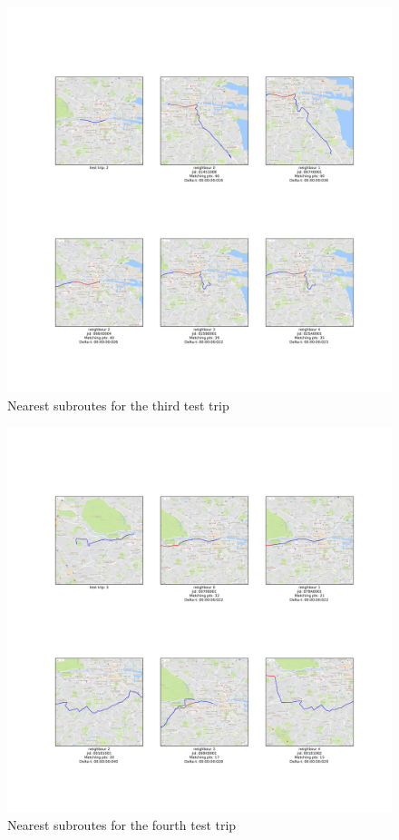 \documentclass[12pt]{article}
\begin{document}
	\begin{figure} [H]
		\begin{center}
			\includegraphics [scale = 0.40] {subroutes3.jpg}
			\caption{Nearest subroutes for the third test trip}
		\end{center}
	\end{figure} 
	
	\begin{figure} [H]
		\begin{center}
			\includegraphics [scale = 0.40] {subroutes4.jpg}
			\caption{Nearest subroutes for the fourth test trip}
		\end{center}
	\end{figure} 
	
\end{document}
